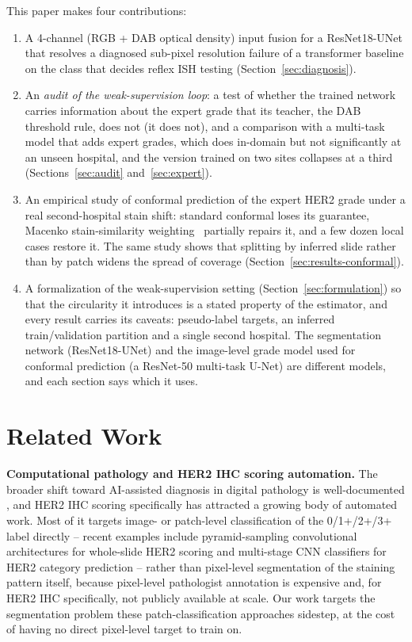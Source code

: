 \documentclass[conference]{IEEEtran}
\begin{document}
This paper makes four contributions:

\begin{enumerate}
\item A 4-channel (RGB + DAB optical density) input fusion for a ResNet18-UNet that resolves a diagnosed sub-pixel resolution failure of a
  transformer baseline on the class that decides reflex ISH testing (Section~\ref{sec:diagnosis}).
\item An \emph{audit of the weak-supervision loop}: a test of whether the trained network carries information about the expert grade that
  its teacher, the DAB threshold rule, does not (it does not), and a comparison with a multi-task model that adds expert grades, which
  does in-domain but not significantly at an unseen hospital, and the version trained on two sites collapses at a third (Sections~\ref{sec:audit} and~\ref{sec:expert}).
\item An empirical study of conformal prediction of the expert HER2 grade under a real second-hospital stain shift: standard conformal loses
  its guarantee, Macenko stain-similarity weighting~\cite{tibshirani2019,macenko2009} partially repairs it, and a few dozen local cases restore it.
  The same study shows that splitting by inferred slide rather than by patch widens the spread of coverage
  (Section~\ref{sec:results-conformal}).
\item A formalization of the weak-supervision setting (Section~\ref{sec:formulation}) so that the circularity it introduces is a stated
  property of the estimator, and every result carries its caveats: pseudo-label targets, an inferred train/validation partition and a single
  second hospital. The segmentation network (ResNet18-UNet) and the image-level grade model used for conformal prediction (a ResNet-50
  multi-task U-Net) are different models, and each section says which it uses.
\end{enumerate}

\section{Related Work}
\label{sec:related}

\textbf{Computational pathology and HER2 IHC scoring automation.} The
broader shift toward AI-assisted diagnosis in digital pathology is
well-documented \cite{bera2019}, and HER2 IHC scoring specifically has
attracted a growing body of automated work. Most of it targets image- or
patch-level classification of the 0/1+/2+/3+ label directly -- recent
examples include pyramid-sampling convolutional architectures for
whole-slide HER2 scoring \cite{selcuk2024} and multi-stage CNN classifiers
for HER2 category prediction \cite{mridha2022} -- rather than pixel-level
segmentation of the staining pattern itself, because pixel-level
pathologist annotation is expensive and, for HER2 IHC specifically, not
publicly available at scale. Our work targets the segmentation problem
these patch-classification approaches sidestep, at the cost of having no
direct pixel-level target to train on.
\end{document}
